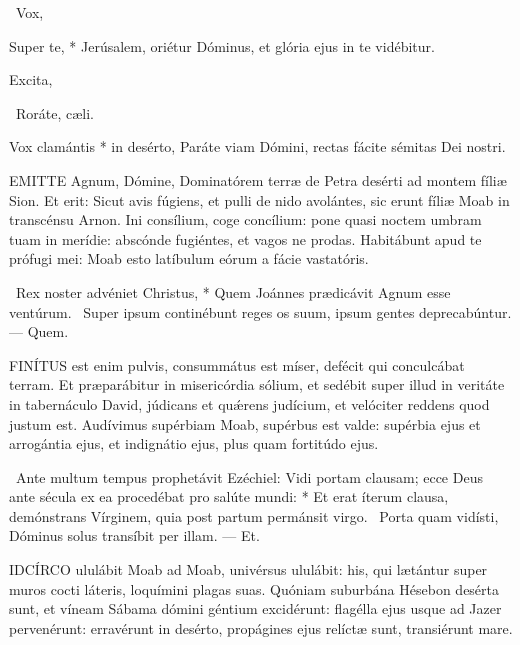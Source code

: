 \V\ Vox, 

 Super te, * Jerúsalem, oriétur Dóminus, et glória ejus in te vidébitur.

 Excita, 

\V\ Roráte, cæli.

 Vox clamántis * in desérto, Paráte viam Dómini, rectas fácite sémitas Dei nostri.

\sectionornament




\lettrine[lines=2]{E}{MITTE} Agnum, Dómine, Dominatórem terræ de Petra desérti ad montem fíliæ Sion. Et erit: Sicut avis fúgiens, et pulli de nido avolántes, sic erunt fíliæ Moab in transcénsu Arnon. Ini consílium, coge concílium: pone quasi noctem umbram tuam in merídie: abscónde fugiéntes, et vagos ne prodas. Habitábunt apud te prófugi mei: Moab esto latíbulum eórum a fácie vastatóris.

\R\ Rex noster advéniet Christus, * Quem Joánnes prædicávit Agnum esse ventúrum. \V\ Super ipsum continébunt reges os suum, ipsum gentes deprecabúntur. --- Quem.


\lettrine[lines=2]{F}{INÍTUS} est enim pulvis, consummátus est míser, defécit qui conculcábat terram. Et præparábitur in misericórdia sólium, et sedébit super illud in veritáte in tabernáculo David, júdicans et quǽrens judícium, et velóciter reddens quod justum est. Audívimus supérbiam Moab, supérbus est valde: supérbia ejus et arrogántia ejus, et indignátio ejus, plus quam fortitúdo ejus.

\R\ Ante multum tempus prophetávit Ezéchiel: Vidi portam clausam; ecce Deus ante sécula ex ea procedébat pro salúte mundi: * Et erat íterum clausa, demónstrans Vírginem, quia post partum permánsit virgo. \V\ Porta quam vidísti, Dóminus solus transíbit per illam. --- Et.


\lettrine[lines=2]{I}{DCÍRCO} ululábit Moab ad Moab, univérsus ululábit: his, qui lætántur super muros cocti láteris, loquímini plagas suas. Quóniam suburbána Hésebon desérta sunt, et víneam Sábama dómini géntium excidérunt: flagélla ejus usque ad Jazer pervenérunt: erravérunt in desérto, propágines ejus relíctæ sunt, transiérunt mare.

